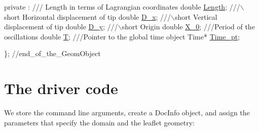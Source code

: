 \begin{DoxyCodeInclude}
private :
 \textcolor{comment}{}
\textcolor{comment}{ /// Length in terms of Lagrangian coordinates}
\textcolor{comment}{} \textcolor{keywordtype}{double} \hyperlink{classLeaflet_a64c27b796ceece358d09d137f15bbf20}{Length};
 \textcolor{comment}{}
\textcolor{comment}{ ///\(\backslash\)short Horizontal displacement of tip}
\textcolor{comment}{} \textcolor{keywordtype}{double} \hyperlink{classLeaflet_a473b6f4ef98bfba9e2c6974027ba4f4b}{D\_x};
 \textcolor{comment}{}
\textcolor{comment}{ ///\(\backslash\)short Vertical displacement of tip}
\textcolor{comment}{} \textcolor{keywordtype}{double} \hyperlink{classLeaflet_af9c75c7aeecae4b14f7ba0fb245eb8ee}{D\_y};
 \textcolor{comment}{}
\textcolor{comment}{///\(\backslash\)short Origin}
\textcolor{comment}{} \textcolor{keywordtype}{double} \hyperlink{classLeaflet_a29a25366a0cf97ad0dd36172fdfa3d0c}{X\_0};
 \textcolor{comment}{}
\textcolor{comment}{ ///Period of the oscillations}
\textcolor{comment}{} \textcolor{keywordtype}{double} \hyperlink{classLeaflet_a0d78b5fb3ec71009d4a9bcc79f8a85a9}{T};
\textcolor{comment}{}
\textcolor{comment}{ ///Pointer to the global time object}
\textcolor{comment}{} Time* \hyperlink{classLeaflet_ac10f13ad45456dc714ab57042861de53}{Time\_pt};

\}; \textcolor{comment}{//end\_of\_the\_GeomObject}

\end{DoxyCodeInclude}




 

 \hypertarget{index_main}{}\section{The driver code}\label{index_main}
We store the command line arguments, create a {\ttfamily Doc\+Info} object, and assign the parameters that specify the domain and the leaflet geometry\+:

